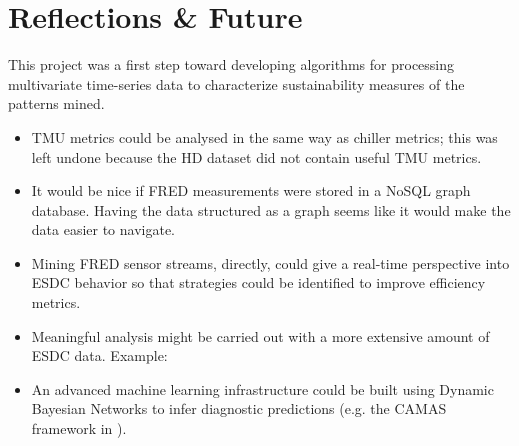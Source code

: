  \section*{Reflections \& Future}
This project was a first step toward developing algorithms for processing multivariate time-series data to characterize sustainability measures of the patterns mined.
\begin{itemize}
  \item TMU metrics could be analysed in the same way as chiller metrics; this was left undone because 
the HD dataset did not contain useful TMU metrics.
   \item It would be nice if FRED measurements were stored in a NoSQL graph database. Having the data structured as a graph seems like it would make the data easier to navigate. 
   \item Mining FRED sensor streams, directly, could give a real-time perspective into ESDC behavior so that strategies could be identified to improve efficiency metrics.
\item  Meaningful analysis might be carried out with a more extensive amount of ESDC data.
Example: \cite[pp. :14--34:16 (see Tables I--V)]{Patnaik2011}

  
\item An advanced machine learning infrastructure could be built using Dynamic Bayesian Networks to infer diagnostic predictions (e.g. the CAMAS framework in \cite[p. :8 (see Fig 5.)]{Patnaik2011}).
\end{itemize}


  
 




